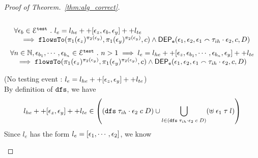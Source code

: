 \begin{proof}[Proof of Theorem.~\ref{thm:alg_correct}]
\begin{case}
\begin{equation}
\begin{array}{l}
\end{array}
\end{equation}
%
\begin{equation}
  \begin{array}{l}
    \forall \mathtt{\epsilon}_b \in \mathcal{E}^{\mathtt{{test}}} ~.~ 
    l_e = l_{he} ++ [\mathtt{\epsilon}_z, \mathtt{\epsilon}_b, \mathtt{\epsilon}_y] ++ l_{te}
    \\ \quad
    \implies \mathtt{flowsTo}(\pi_1(\mathtt{\epsilon}_z)^{\pi_2(\mathtt{\epsilon}_y)}, \pi_1(\mathtt{\epsilon}_y)^{\pi_2(\mathtt{\epsilon}_y)}, c)
     \land 
   \mathsf{DEP_{\mathtt{e}}}(\mathtt{\epsilon}_1, \mathtt{\epsilon}_2, \mathtt{\epsilon}_1 \smallfrown \mathtt{\tau}_{ih} \cdot \mathtt{\epsilon}_2, {c}, D) 
\end{array}
  \end{equation}
%
%
\begin{equation}
\begin{array}{l}
  \forall n \in \mathbb{N}, \mathtt{\epsilon}_{b_1}, \cdots, \mathtt{\epsilon}_{b_n} \in \mathcal{E}^{\mathtt{{test}}}~.~
   n > 1 \implies
   l_e = l_{he} ++ {[\mathtt{\epsilon}_z, \mathtt{\epsilon}_{b_1}, \cdots, \mathtt{\epsilon}_{b_n}, \mathtt{\epsilon}_y]} ++ l_{te}
   \\ \quad
  \implies \mathtt{flowsTo}(\pi_1(\mathtt{\epsilon}_z)^{\pi_2(\mathtt{\epsilon}_y)}, \pi_1(\mathtt{\epsilon}_y)^{\pi_2(\mathtt{\epsilon}_y)}, c)
  \land 
  \mathsf{DEP_{\mathtt{e}}}(\mathtt{\epsilon}_1, \mathtt{\epsilon}_2, \mathtt{\epsilon}_1 \smallfrown \mathtt{\tau}_{ih} \cdot \mathtt{\epsilon}_2, {c}, D) 
\end{array}
\end{equation}
%
\begin{subcase}(No testing event : $l_e = l_{he} ++ [\mathtt{\epsilon}_z, \mathtt{\epsilon}_y] ++ l_{te}$)
\\
By definition of $\mathtt{dfs}$, we have
%
\[
  l_{he} ++ [\event_z, \event_y] ++ l_{te}  \in 
  \left(  (\kw{dfs} \eapp {\trace_{ih} \cdot \event_2} \eapp c \eapp D ) \cup
  \bigcup\limits_{l \in (\kw{dfs} \eapp {\trace_{ih} \cdot \event_2} \eapp c \eapp D) }(\uplus \eapp \event_1 \eapp \trace \eapp l)
  \right)
\]
Since $l_e$ has the form $l_e = [\mathtt{\epsilon}_1, \cdots, \mathtt{\epsilon}_2] $, we know

\end{subcase}
\end{case}
\end{proof}
